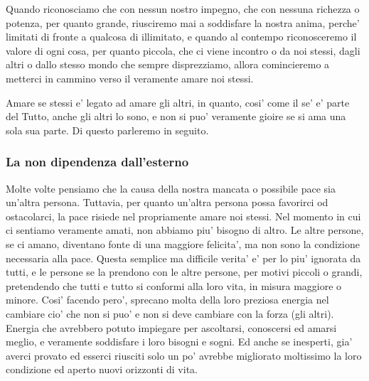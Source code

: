 Quando riconosciamo che con nessun nostro impegno, che con nessuna richezza o potenza, per quanto grande, riusciremo mai a soddisfare la nostra anima, perche' limitati di fronte a qualcosa di illimitato, e quando al contempo riconosceremo il valore di ogni cosa, per quanto piccola, che ci viene incontro o da noi stessi, dagli altri o dallo stesso mondo che sempre disprezziamo, allora comincieremo a metterci in cammino verso il veramente amare noi stessi.

Amare se stessi e' legato ad amare gli altri, in quanto, cosi' come il se' e' parte del Tutto, anche gli altri lo sono, e non si puo' veramente gioire se si ama una sola sua parte. Di questo parleremo in seguito.

\subsubsection{La non dipendenza dall'esterno}

Molte volte pensiamo che la causa della nostra mancata o possibile pace sia un'altra persona. Tuttavia, per quanto un'altra persona possa favorirci od ostacolarci, la pace risiede nel propriamente amare noi stessi. Nel momento in cui ci sentiamo veramente amati, non abbiamo piu' bisogno di altro. Le altre persone, se ci amano, diventano fonte di una maggiore felicita', ma non sono la condizione necessaria alla pace.
Questa semplice ma difficile verita' e' per lo piu' ignorata da tutti, e le persone se la prendono con le altre persone, per motivi piccoli o grandi, pretendendo che tutti e tutto si conformi alla loro vita, in misura maggiore o minore. Cosi' facendo pero', sprecano molta della loro preziosa energia nel cambiare cio' che non si puo' e non si deve cambiare con la forza (gli altri). Energia che avrebbero potuto impiegare per ascoltarsi, conoscersi ed amarsi meglio, e veramente soddisfare i loro bisogni e sogni. Ed anche se inesperti, gia' averci provato ed esserci riusciti solo un po' avrebbe migliorato moltissimo la loro condizione ed aperto nuovi orizzonti di vita.


